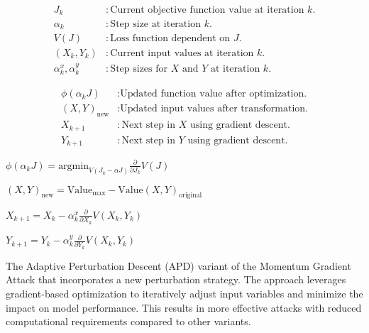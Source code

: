 \[
\begin{aligned}
J_k & : \text{Current objective function value at iteration } k. \\
\alpha_k & : \text{Step size at iteration } k. \\
V(J) & : \text{Loss function dependent on } J. \\
(X_k, Y_k) & : \text{Current input values at iteration } k. \\
\alpha_k^x, \alpha_k^y & : \text{Step sizes for } X \text{ and } Y \text{ at iteration } k.
\end{aligned}
\]

\[
\begin{aligned}
\phi(\alpha_k J) &: \text{Updated function value after optimization.} \\
(X, Y)_{\text{new}} &: \text{Updated input values after transformation.} \\
X_{k+1} &: \text{Next step in } X \text{ using gradient descent.} \\
Y_{k+1} &: \text{Next step in } Y \text{ using gradient descent.}
\end{aligned}
\]


$\phi(\alpha_k J) = \text{argmin}_{V(J_k - \alpha J)} \frac{\partial}{\partial J_k} V(J)$

$(X, Y)_{\text{new}} = \text{Value}_{\text{max}} - \text{Value}(X, Y)_{\text{original}}$

$X_{k+1} = X_k - \alpha_k^x \frac{\partial}{\partial X_k} V(X_k, Y_k)$

$Y_{k+1} = Y_k - \alpha_k^y \frac{\partial}{\partial Y_k} V(X_k, Y_k)$


The Adaptive Perturbation Descent (APD) variant of the Momentum Gradient Attack that incorporates a new perturbation strategy. The approach leverages gradient-based optimization to iteratively adjust input variables and minimize the impact on model performance. This results in more effective attacks with reduced computational requirements compared to other variants.